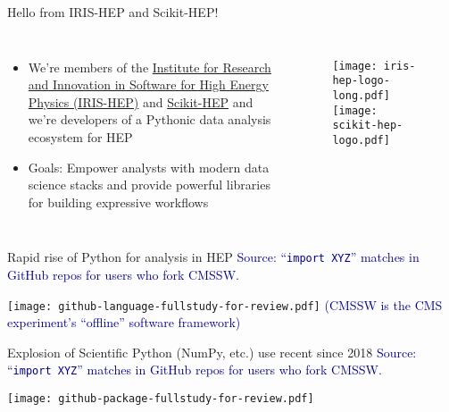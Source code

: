\begin{frame}{Hello from IRIS-HEP and Scikit-HEP!}
  \begin{columns}
    \Large
    \begin{itemize}\setlength{\itemsep}{0.5 cm}
      \item We're members of the \href{https://iris-hep.org/}{Institute for Research and Innovation in Software for High Energy Physics (IRIS-HEP)} and \href{https://scikit-hep.org/}{Scikit-HEP} and we're developers of a Pythonic data analysis ecosystem for HEP
      \item Goals: Empower analysts with modern data science stacks and provide powerful libraries for building expressive workflows
    \end{itemize}
%
    \begin{figure}
        \begin{center}
            \texttt{[image: iris-hep-logo-long.pdf]}
            \texttt{[image: scikit-hep-logo.pdf]}
        \end{center}
    \end{figure}
  \end{columns}
\end{frame}

\begin{frame}{Rapid rise of Python for analysis in HEP}
\vspace{0.25 cm}
\textcolor{darkblue}{Source: ``\texttt{import XYZ}'' matches in GitHub repos for users who fork CMSSW.}

\vspace{0.2 cm}
\texttt{[image: github-language-fullstudy-for-review.pdf]}
\textcolor{darkblue}{\tiny (CMSSW is the CMS experiment's ``offline'' software framework)}
\end{frame}

\begin{frame}{Explosion of Scientific Python (NumPy, etc.) use recent since 2018}
\vspace{0.25 cm}
\textcolor{darkblue}{Source: ``\texttt{import XYZ}'' matches in GitHub repos for users who fork CMSSW.}

\vspace{0.2 cm}
\texttt{[image: github-package-fullstudy-for-review.pdf]}
\end{frame}

